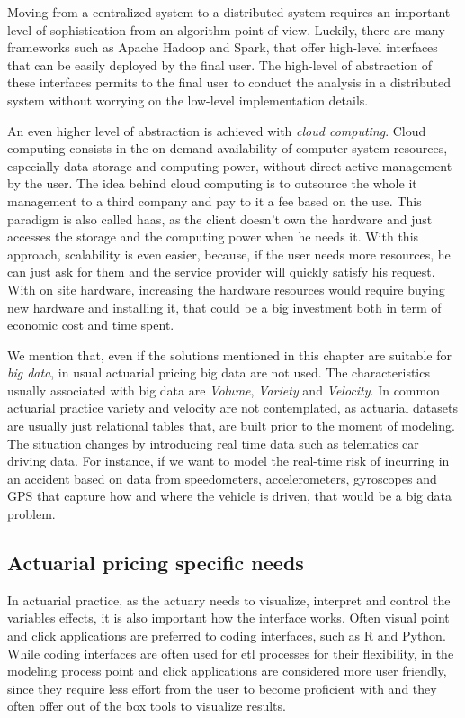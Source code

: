 \documentclass[a4paper, twoside, openright, 12pt]{report}
\theoremstyle{definition}
\theoremstyle{definition}
\theoremstyle{definition}
\theoremstyle{remark}
\begin{document}
Moving from a centralized system to a distributed system requires an important level of sophistication from an algorithm point of view. Luckily, there are many frameworks such as Apache Hadoop and Spark, that offer high-level interfaces that can be easily deployed by the final user. The high-level of abstraction of these interfaces permits to the final user to conduct the analysis in a distributed system without worrying on the low-level implementation details.

An even higher level of abstraction is achieved with \emph{cloud computing}. Cloud computing consists in the on-demand availability of computer system resources, especially data storage and computing power, without direct active management by the user. The idea behind cloud computing is to outsource the whole \ac{it} management to a third company and pay to it a fee based on the use. This paradigm is also called \ac{haas}, as the client doesn't own the hardware and just accesses the storage and the computing power when he needs it. With this approach, scalability is even easier, because, if the user needs more resources, he can just ask for them and the service provider will quickly satisfy his request. With on site hardware, increasing the hardware resources would require buying new hardware and installing it, that could be a big investment both in term of economic cost and time spent.

We mention that, even if the solutions mentioned in this chapter are suitable for \emph{big data}, in usual actuarial pricing big data are not used. The characteristics usually associated with big data are \emph{Volume}, \emph{Variety} and \emph{Velocity}. In common actuarial practice variety and velocity are not contemplated, as actuarial datasets are usually just relational tables that, are built prior to the moment of modeling. The situation changes by introducing real time data such as telematics car driving data. For instance, if we want to model the real-time risk of incurring in an accident based on data from speedometers, accelerometers, gyroscopes and GPS that capture how and where the vehicle is driven, that would be a big data problem.

\hypertarget{chap:actuarial-pricing-specific-needs}{%
\subsection{Actuarial pricing specific needs}\label{chap:actuarial-pricing-specific-needs}}

In actuarial practice, as the actuary needs to visualize, interpret and control the variables effects, it is also important how the interface works. Often visual point and click applications are preferred to coding interfaces, such as R and Python. While coding interfaces are often used for \ac{etl} processes for their flexibility, in the modeling process point and click applications are considered more user friendly, since they require less effort from the user to become proficient with and they often offer out of the box tools to visualize results.
\end{document}
